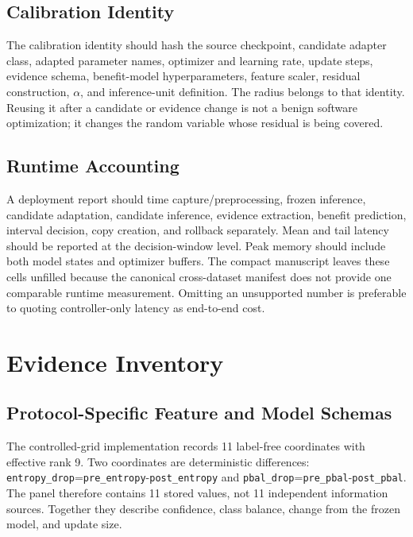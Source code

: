 \subsection{Calibration Identity}

The calibration identity should hash the source checkpoint, candidate adapter class, adapted
parameter names, optimizer and learning rate, update steps, evidence schema, benefit-model
hyperparameters, feature scaler, residual construction, $\alpha$, and inference-unit definition.
The radius belongs to that identity. Reusing it after a candidate or evidence change is not a benign
software optimization; it changes the random variable whose residual is being covered.

\subsection{Runtime Accounting}

A deployment report should time capture/preprocessing, frozen inference, candidate adaptation,
candidate inference, evidence extraction, benefit prediction, interval decision, copy creation, and
rollback separately. Mean and tail latency should be reported at the decision-window level. Peak
memory should include both model states and optimizer buffers. The compact manuscript leaves these
cells unfilled because the canonical cross-dataset manifest does not provide one comparable runtime
measurement. Omitting an unsupported number is preferable to quoting controller-only latency as
end-to-end cost.

\section{Evidence Inventory}
\label{app:compact-evidence}

\subsection{Protocol-Specific Feature and Model Schemas}

The controlled-grid implementation records 11 label-free coordinates with effective rank 9.
Two coordinates are deterministic differences:
\texttt{entropy\_drop}=\texttt{pre\_entropy}-\texttt{post\_entropy} and
\texttt{pbal\_drop}=\texttt{pre\_pbal}-\texttt{post\_pbal}. The panel therefore contains 11
stored values, not 11 independent information sources. Together they describe confidence, class
balance, change from the frozen model, and update size.

